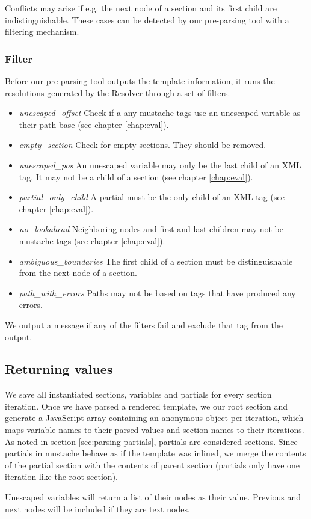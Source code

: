 Conflicts may arise if e.g. the next node of a section and its first child are
indistinguishable. These cases can be detected by our pre-parsing tool with a
filtering mechanism.

\subsubsection{Filter}
Before our pre-parsing tool outputs the template information, it runs the
resolutions generated by the Resolver through a set of filters.

\begin{itemize}
\item \emph{unescaped\_offset} Check if a any mustache tags use an unescaped
                               variable as their path base
                               (see chapter \ref{chap:eval}).
\item \emph{empty\_section} Check for empty sections. They should be removed.
\item \emph{unescaped\_pos} An unescaped variable may only be the last child
                            of an XML tag. It may not be a child of a section
                            (see chapter \ref{chap:eval}).
\item \emph{partial\_only\_child} A partial must be the only child of an XML tag
                                 (see chapter \ref{chap:eval}).
\item \emph{no\_lookahead} Neighboring nodes and first and last children may not
                           be mustache tags (see chapter \ref{chap:eval}).
\item \emph{ambiguous\_boundaries} The first child of a section must be
                                   distinguishable from the next node of a
                                   section.
\item \emph{path\_with\_errors} Paths may not be based on tags that have
                                produced any errors.
\end{itemize}

We output a message if any of the filters fail and exclude that tag from the
output.

\subsection{Returning values}
We save all instantiated sections, variables and partials for every section
iteration. Once we have parsed a rendered template, we our root section and
generate a JavaScript array containing an anonymous object per iteration,
which maps variable names to their parsed values and section names to their
iterations.
As noted in section \ref{sec:parsing-partials}, partials are considered
sections. Since partials in mustache behave as if the template was inlined,
we merge the contents of the partial section with the contents of
parent section (partials only have one iteration like the root section).

Unescaped variables will return a list of their nodes as their value.
Previous and next nodes will be included if they are text nodes.
